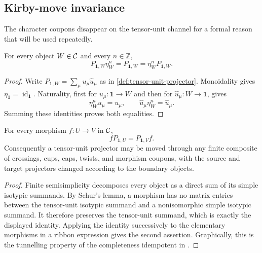 \subsection{Kirby-move invariance}
\label{subsec:kirby-invariance}

The character coupons disappear on the tensor-unit channel for a formal
reason that will be used repeatedly.

\begin{lemma}
\label{lem:unit-projector-absorbs-character}
For every object $W\in\mathcal{C}$ and every $n\in\mathbb Z$,
\[
  P_{\mathbf1,W}\eta_W^n=P_{\mathbf1,W}
  =\eta_W^nP_{\mathbf1,W}.
\]
\end{lemma}

\begin{proof}
Write $P_{\mathbf1,W}=\sum_\mu u_\mu\widehat u_\mu$ as in
\cref{def:tensor-unit-projector}.  Monoidality gives
$\eta_{\mathbf1}=\operatorname{id}_{\mathbf1}$.  Naturality, first for
$u_\mu\colon\mathbf1\to W$ and then for
$\widehat u_\mu\colon W\to\mathbf1$, gives
\[
  \eta_W^n u_\mu=u_\mu,
  \qquad
  \widehat u_\mu\eta_W^n=\widehat u_\mu.
\]
Summing these identities proves both equalities.
\end{proof}

\begin{lemma}
\label{lem:unit-projector-naturality}
For every morphism $f\colon U\to V$ in $\mathcal{C}$,
\[
  fP_{\mathbf1,U}=P_{\mathbf1,V}f.
\]
Consequently a tensor-unit projector may be moved through any finite
composite of crossings, cups, caps, twists, and morphism coupons, with the
source and target projectors changed according to the boundary objects.
\end{lemma}

\begin{proof}
Finite semisimplicity decomposes every object as a direct sum of its simple
isotypic summands.  By Schur's lemma, a morphism has no matrix entries
between the tensor-unit isotypic summand and a nonisomorphic simple
isotypic summand.  It therefore preserves the tensor-unit summand, which is
exactly the displayed identity.  Applying the identity successively to the
elementary morphisms in a ribbon expression gives the second assertion.
Graphically, this is the tunnelling property of the completeness idempotent
in \cite[Lemmas~2.27--2.28]{Tham2021}.
\end{proof}

